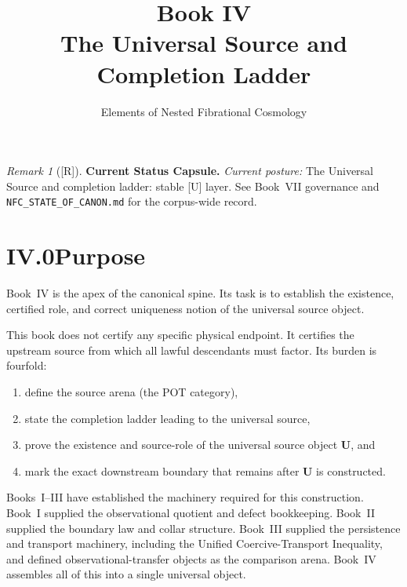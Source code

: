 \documentclass[12pt,oneside]{amsbook}
\theoremstyle{plain}
\theoremstyle{definition}
\theoremstyle{remark}
\newtheorem{remark}[theorem]{Remark}
\newcommand{\status}[1]{\textup{[#1]}}
\begin{document}
\title{Book IV\\[6pt]The Universal Source and Completion Ladder}
\author{Elements of Nested Fibrational Cosmology}
\date{}
\maketitle

\tableofcontents

\bigskip


\begin{remark}[\status{R}]\label{cap:book4-status}
\textbf{Current Status Capsule.} \emph{Current posture:} The Universal Source and completion ladder: stable [U] layer. See Book~VII governance and \texttt{NFC\_STATE\_OF\_CANON.md} for the corpus-wide record.
\end{remark}

\section*{IV.0\quad Purpose}

Book~IV is the apex of the canonical spine.  Its task is to establish
the existence, certified role, and correct uniqueness notion of the
universal source object.

This book does not certify any specific physical endpoint.  It
certifies the upstream source from which all lawful descendants must
factor.  Its burden is fourfold:
\begin{enumerate}
  \item define the source arena (the POT category),
  \item state the completion ladder leading to the universal source,
  \item prove the existence and source-role of the universal source
        object $\mathbf{U}$, and
  \item mark the exact downstream boundary that remains after
        $\mathbf{U}$ is constructed.
\end{enumerate}

Books~I--III have established the machinery required for this
construction.  Book~I supplied the observational quotient and defect
bookkeeping.  Book~II supplied the boundary law and collar structure.
Book~III supplied the persistence and transport machinery, including
the Unified Coercive-Transport Inequality, and defined
observational-transfer objects as the comparison arena.  Book~IV
assembles all of this into a single universal object.
\end{document}
